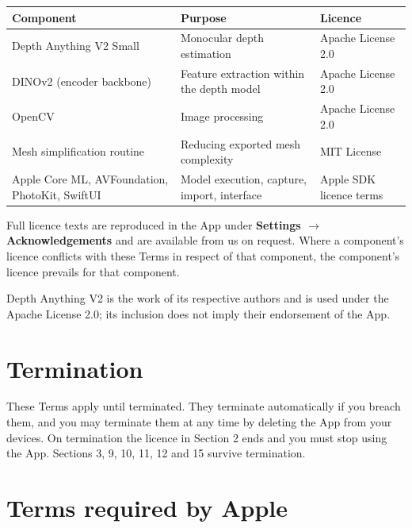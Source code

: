 \documentclass[11pt]{article}
\begin{document}
\begin{plainbox}
\uifont\small
\begin{tabular}{@{}p{}p{}p{}@{}}
\toprule
\textbf{Component} & \textbf{Purpose} & \textbf{Licence} \\
\midrule
Depth Anything V2 Small & Monocular depth estimation & Apache License 2.0 \\[3pt]
DINOv2 (encoder backbone)   & Feature extraction within the depth model &
  Apache License 2.0 \\[3pt]
OpenCV                      & Image processing & Apache License 2.0 \\[3pt]
Mesh simplification routine & Reducing exported mesh complexity & MIT License \\[3pt]
Apple Core ML, AVFoundation, PhotoKit, SwiftUI & Model execution, capture, import, interface &
  Apple SDK licence terms \\
\bottomrule
\end{tabular}
\end{plainbox}

Full licence texts are reproduced in the App under \textbf{Settings $\rightarrow$
Acknowledgements}  and are available from us on request. Where a component's licence conflicts with these Terms in respect of that
component, the component's licence prevails for that component.

Depth Anything V2 is the work of its respective authors and is used under the
Apache License 2.0; its inclusion does not imply their endorsement of the App.

\section{Termination}

These Terms apply until terminated. They terminate automatically if you breach them, and
you may terminate them at any time by deleting the App from your devices. On
termination the licence in Section 2 ends and you must stop using the App. Sections 3,
9, 10, 11, 12 and 15 survive termination.

\section{Terms required by Apple}
\end{document}
